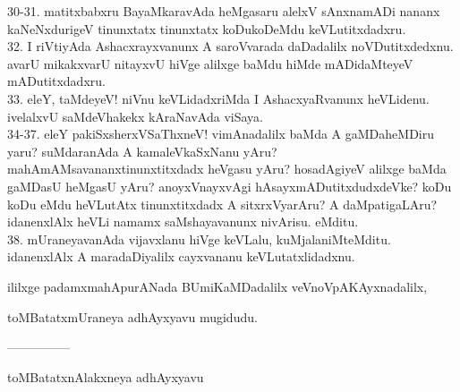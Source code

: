 \documentclass{article}
\begin{document}
30-31. matitxbabxru BayaMkaravAda heMgasaru alelxV sAnxnamADi nananx kaNeNxdurigeV tinunxtatx tinunxtatx koDukoDeMdu keVLutitxdadxru.\\
32. I riVtiyAda Ashacxrayxvanunx A saroVvarada daDadalilx noVDutitxdedxnu. avarU mikakxvarU nitayxvU hiVge alilxge baMdu hiMde mADidaMteyeV mADutitxdadxru.\\
33. eleY, taMdeyeV! niVnu keVLidadxriMda I AshacxyaRvanunx heVLidenu. ivelalxvU saMdeVhakekx kAraNavAda viSaya.\\
34-37. eleY pakiSxsherxVSaThxneV! vimAnadalilx baMda A gaMDaheMDiru yaru? suMdaranAda A kamaleVkaSxNanu yAru? mahAmAMsavananxtinunxtitxdadx heVgasu yAru? hosadAgiyeV alilxge baMda gaMDasU heMgasU yAru? anoyxVnayxvAgi hAsayxmADutitxdudxdeVke? koDu koDu eMdu heVLutAtx tinunxtitxdadx A sitxrxVyarAru? A daMpatigaLAru? idanenxlAlx heVLi namamx saMshayavanunx nivArisu. eMditu.\\
38. mUraneyavanAda vijavxlanu hiVge keVLalu, kuMjalaniMteMditu. idanenxlAlx A maradaDiyalilx cayxvananu keVLutatxlidadxnu.\\

\begin{center}
ililxge padamxmahApurANada BUmiKaMDadalilx veVnoVpAKAyxnadalilx,
\end{center}

\begin{center}
toMBatatxmUraneya adhAyxyavu mugidudu.
\end{center}

\begin{center}
---------------
\end{center}

\begin{center}
toMBatatxnAlakxneya adhAyxyavu
\end{center}
\end{document}
